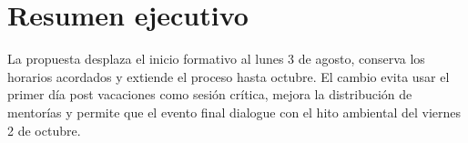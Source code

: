 \documentclass[10pt,a4paper]{article}
\begin{document}
\section{Resumen ejecutivo}

La propuesta desplaza el inicio formativo al lunes 3 de agosto, conserva los horarios acordados y extiende el proceso hasta octubre. El cambio evita usar el primer día post vacaciones como sesión crítica, mejora la distribución de mentorías y permite que el evento final dialogue con el hito ambiental del viernes 2 de octubre.
\end{document}
